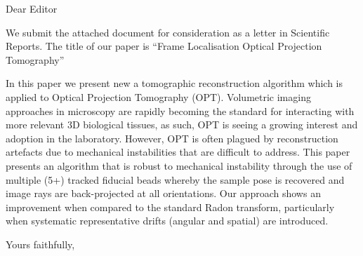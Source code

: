 \documentclass{letter}
\begin{document}
\begin{letter}{}
\opening{Dear Editor}

We submit the attached document for consideration as a letter in Scientific Reports. The title of our paper is ``Frame Localisation Optical Projection Tomography''

In this paper we present new a tomographic reconstruction algorithm which is applied to Optical Projection Tomography (OPT). Volumetric imaging approaches in microscopy are rapidly becoming the standard for interacting with more relevant 3D biological tissues, as such, OPT is seeing a growing interest and adoption in the laboratory. However, OPT is often plagued by reconstruction artefacts due to mechanical instabilities that are difficult to address. This paper presents an algorithm that is robust to mechanical instability through the use of multiple (5+) tracked fiducial beads whereby the sample pose is recovered and image rays are back-projected at all orientations. Our approach shows an improvement when compared to the standard Radon transform, particularly when systematic representative drifts (angular and spatial) are introduced.

%
%
%

%

\closing{Yours faithfully,}

%
%

\end{letter}
\end{document}
